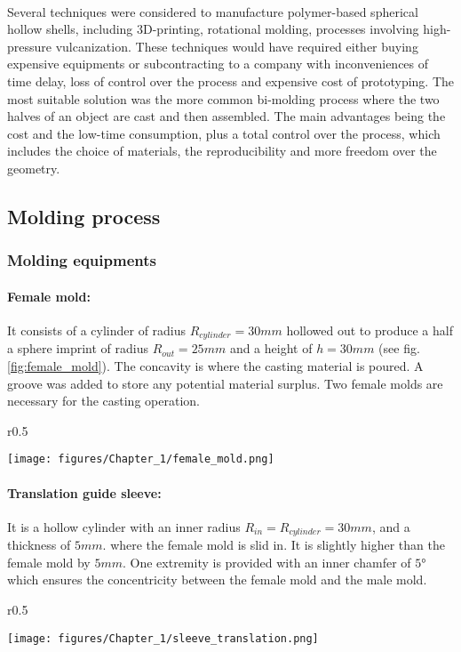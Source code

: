 \paragraph{}
Several techniques were considered to manufacture polymer-based spherical hollow shells, including 3D-printing, rotational molding, processes involving high-pressure vulcanization. These techniques would have required either buying expensive equipments or subcontracting to a company with inconveniences of time delay, loss of control over the process and expensive cost of prototyping. 
The most suitable solution was the more common bi-molding process where the two halves of an object are cast and then assembled. The main advantages being the cost and the low-time consumption, plus a total control over the process, which includes the choice of materials, the reproducibility and more freedom over the geometry.
\subsection{Molding process}
\subsubsection{Molding equipments}
\paragraph{Female mold:}
It consists of a cylinder of radius $R_{cylinder}=30 mm$  hollowed out to produce a half a sphere imprint of radius $R_{out}=25 mm$ and a height of $h = 30 mm$ (see fig.\ref{fig:female_mold}). The concavity is where the casting material is poured.
A groove was added to store any potential material surplus. Two female molds are necessary for the casting operation.
\begin{wrapfigure}{r}{0.5\textwidth}
  \begin{center}
    \texttt{[image: figures/Chapter\_1/female\_mold.png]}
  \end{center}
	\label{fig:female_mold}
  \caption{longitudinal section of the female mold}
\end{wrapfigure}%
\paragraph{Translation guide sleeve:}
It is a hollow cylinder with an inner radius $R_{in} = R_{cylinder} = 30 mm$, and a thickness of $5 mm$. where the female mold is slid in. It is slightly higher than the female mold by $5 mm$. One extremity is provided with an inner chamfer of $5°$ which ensures the concentricity between the female mold and the male mold.
\begin{wrapfigure}{r}{0.5\textwidth}
  \begin{center}
    \texttt{[image: figures/Chapter\_1/sleeve\_translation.png]}
  \end{center}
	\label{fig:sleeve_1}
  \caption{longitudinal section of the sleeve}
\end{wrapfigure}%
